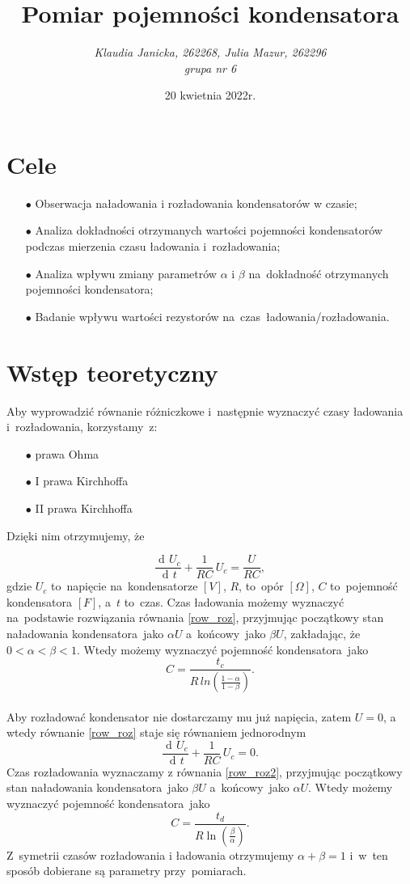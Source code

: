 \documentclass[12pt]{mwart}
\title{\textbf{Pomiar pojemności kondensatora}}
\author{\fontsize{12pt}{12pt}\selectfont \emph{Klaudia Janicka, 262268, Julia Mazur, 262296} \\\emph{grupa nr 6}}
\date{20 kwietnia 2022r.}
\DeclareMathOperator{\diff}{d\!}
\begin{document}
	\maketitle
	\section{Cele}
	\begin{itemize}
		\item[$\bullet$] Obserwacja naładowania i rozładowania kondensatorów w czasie;
		\item[$\bullet$] Analiza dokładności otrzymanych wartości pojemności kondensatorów podczas mierzenia czasu ładowania i~rozładowania;
		\item[$\bullet$] Analiza wpływu zmiany parametrów $\alpha$ i $\beta$ na~dokładność otrzymanych pojemności kondensatora;
		\item[$\bullet$] Badanie wpływu wartości rezystorów na~czas~ładowania/rozładowania.
	\end{itemize}
	\section{Wstęp teoretyczny}
	\noindent Aby wyprowadzić równanie różniczkowe i~następnie wyznaczyć czasy ładowania i~rozładowania, korzystamy~z:
	\begin{itemize}
		\item[$\bullet$] prawa Ohma
		\item[$\bullet$] I prawa Kirchhoffa
		\item[$\bullet$] II prawa Kirchhoffa
	\end{itemize}
	Dzięki nim otrzymujemy, że 
	
	\begin{equation}\label{row_roz}
		\frac{\diff U_{c}}{\diff t} +\frac{1}{RC}\, U_{c}=\frac{U}{RC},
	\end{equation}
	gdzie $U_{c}$ to~napięcie na~kondensatorze $\left[V\right]$, $R$, to~opór $\left[\Omega\right]$, $C$ to~pojemność kondensatora $\left[F\right]$, a~$t$ to~czas.
	Czas ładowania możemy wyznaczyć na~podstawie rozwiązania równania \eqref{row_roz}, przyjmując początkowy stan naładowania kondensatora~jako $\alpha U$ a~końcowy~jako $\beta U$, zakładając, że~$0 < \alpha < \beta < 1$. Wtedy możemy wyznaczyć pojemność kondensatora~jako $$C=\frac{t_{c}}{R\,ln\left(\frac{1-\alpha}{1-\beta}\right)}.$$\label{poj_lad}
	\phantom{a}\\
	Aby rozładować kondensator nie dostarczamy mu już napięcia, zatem $U = 0$, a wtedy równanie \eqref{row_roz} staje się równaniem jednorodnym
	\begin{equation}\label{row_roz2}
		\frac{\diff U_{c}}{\diff t} +\frac{1}{RC}\, U_{c}=0.
	\end{equation}
	Czas rozładowania wyznaczamy z równania \eqref{row_roz2}, przyjmując początkowy stan naładowania kondensatora~jako $\beta U$ a~końcowy~jako $\alpha U$. Wtedy możemy wyznaczyć pojemność kondensatora~jako
	$$C=\frac{t_d}{R\ln\left({\frac{\beta}{\alpha}}\right)}.$$
	Z~symetrii czasów rozładowania i ładowania otrzymujemy $\alpha+\beta=1$ i~w~ten sposób dobierane są parametry przy~pomiarach.
\end{document}
